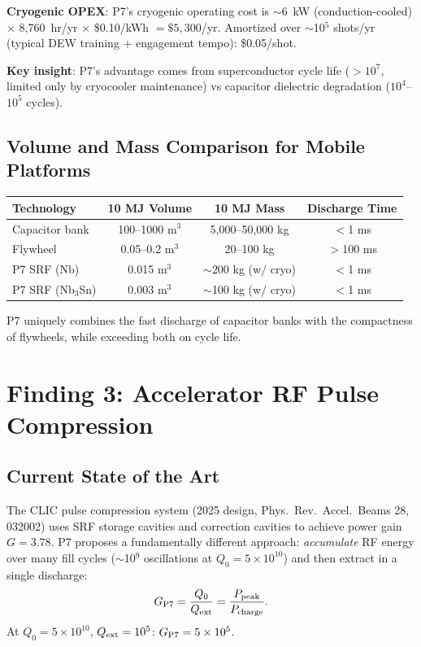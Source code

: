 \documentclass[11pt]{article}
\newcommand{\ee}[1]{\times 10^{#1}}
\begin{document}
\textbf{Cryogenic OPEX}: P7's cryogenic operating cost is
$\sim$6~kW (conduction-cooled) $\times$ 8,760~hr/yr $\times$
\$0.10/kWh $= \$5,300$/yr. Amortized over $\sim$10$^5$ shots/yr
(typical DEW training + engagement tempo): \$0.05/shot.

\textbf{Key insight}: P7's advantage comes from superconductor
cycle life ($>10^7$, limited only by cryocooler maintenance)
vs capacitor dielectric degradation ($10^4$--$10^5$ cycles).

\subsection{Volume and Mass Comparison for Mobile Platforms}

\begin{center}
\begin{tabular}{lccc}
\toprule
Technology & 10 MJ Volume & 10 MJ Mass & Discharge Time \\
\midrule
Capacitor bank & 100--1000 m$^3$ & 5,000--50,000 kg & $<$1 ms \\
Flywheel & 0.05--0.2 m$^3$ & 20--100 kg & $>$100 ms \\
P7 SRF (Nb) & 0.015 m$^3$ & $\sim$200 kg (w/ cryo) & $<$1 ms \\
P7 SRF (Nb$_3$Sn) & 0.003 m$^3$ & $\sim$100 kg (w/ cryo) & $<$1 ms \\
\bottomrule
\end{tabular}
\end{center}

P7 uniquely combines the fast discharge of capacitor banks with
the compactness of flywheels, while exceeding both on cycle life.

\section{Finding 3: Accelerator RF Pulse Compression}
\label{sec:accel}

\subsection{Current State of the Art}

The CLIC pulse compression system (2025 design, Phys.\ Rev.\ Accel.\
Beams 28, 032002) uses SRF storage cavities and correction cavities
to achieve power gain $G = 3.78$. P7 proposes a fundamentally different
approach: \emph{accumulate} RF energy over many fill cycles
($\sim$10$^9$ oscillations at $Q_0 = 5\ee{10}$) and then extract
in a single discharge:
\begin{equation}
G_{\rm P7} = \frac{Q_0}{Q_{\rm ext}} = \frac{P_{\rm peak}}{P_{\rm charge}}.
\end{equation}
At $Q_0 = 5\ee{10}$, $Q_{\rm ext} = 10^5$: $G_{\rm P7} = 5\ee{5}$.
\end{document}
